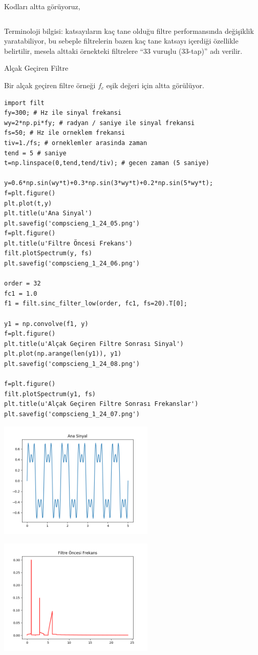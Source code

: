 \documentclass[12pt,fleqn]{article}\usepackage{../../common}
\begin{document}
Kodları altta görüyoruz, 

\inputminted[fontsize=\footnotesize]{python}{filt.py}

Terminoloji bilgisi: katsayıların kaç tane olduğu filtre performansında
değişiklik yaratabiliyor, bu sebeple filtrelerin bazen kaç tane katsayı
içerdiği özellikle belirtilir, mesela alttaki örnekteki filtrelere ``33
vuruşlu (33-tap)'' adı verilir.

Alçak Geçiren Filtre

Bir alçak geçiren filtre örneği $f_c$ eşik değeri için altta görülüyor.

\begin{verbatim}
import filt
fy=300; # Hz ile sinyal frekansi
wy=2*np.pi*fy; # radyan / saniye ile sinyal frekansi
fs=50; # Hz ile orneklem frekansi
tiv=1./fs; # orneklemler arasinda zaman
tend = 5 # saniye
t=np.linspace(0,tend,tend/tiv); # gecen zaman (5 saniye)

y=0.6*np.sin(wy*t)+0.3*np.sin(3*wy*t)+0.2*np.sin(5*wy*t); 
f=plt.figure()
plt.plot(t,y)
plt.title(u'Ana Sinyal')
plt.savefig('compscieng_1_24_05.png')
f=plt.figure()
plt.title(u'Filtre Öncesi Frekans')
filt.plotSpectrum(y, fs)
plt.savefig('compscieng_1_24_06.png')

order = 32
fc1 = 1.0
f1 = filt.sinc_filter_low(order, fc1, fs=20).T[0];

y1 = np.convolve(f1, y)
f=plt.figure()
plt.title(u'Alçak Geçiren Filtre Sonrası Sinyal')
plt.plot(np.arange(len(y1)), y1)
plt.savefig('compscieng_1_24_08.png')

f=plt.figure()
filt.plotSpectrum(y1, fs)
plt.title(u'Alçak Geçiren Filtre Sonrası Frekanslar')
plt.savefig('compscieng_1_24_07.png')
\end{verbatim}

\includegraphics[width=20em]{compscieng_1_24_05.png}

\includegraphics[width=20em]{compscieng_1_24_06.png}
\end{document}
